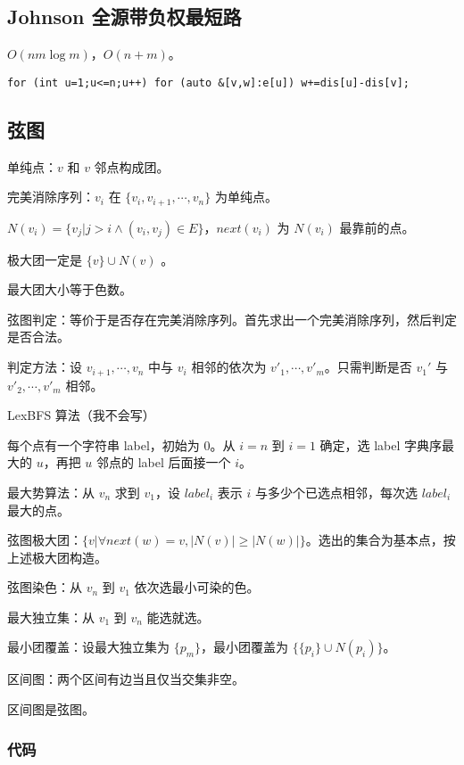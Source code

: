 \documentclass[12pt]{ctexart}
\begin{document}
\subsection{Johnson 全源带负权最短路}

$O(nm\log m)$，$O(n+m)$。

\begin{lstlisting}
for (int u=1;u<=n;u++) for (auto &[v,w]:e[u]) w+=dis[u]-dis[v];
\end{lstlisting}

\subsection{弦图}

单纯点：$v$ 和 $v$ 邻点构成团。

完美消除序列：$v_i$ 在 $\{v_i,v_{i+1},\cdots,v_n\}$ 为单纯点。

$N(v_i)=\{v_j|j>i\land (v_i,v_j)\in E\}$，$next(v_i)$ 为 $N(v_i)$ 最靠前的点。

极大团一定是 $\{v\}\cup N(v)$ 。

最大团大小等于色数。

弦图判定：等价于是否存在完美消除序列。首先求出一个完美消除序列，然后判定是否合法。

判定方法：设 $v_{i+1},\cdots,v_n$ 中与 $v_i$ 相邻的依次为 $v'_1,\cdots,v'_m$。只需判断是否 $v_1'$ 与 $v'_2,\cdots,v'_m$ 相邻。

LexBFS 算法（我不会写）

每个点有一个字符串 label，初始为 $0$。从 $i=n$ 到 $i=1$ 确定，选 label 字典序最大的 $u$，再把 $u$ 邻点的 label 后面接一个 $i$。

最大势算法：从 $v_n$ 求到 $v_1$，设 $label_i$ 表示 $i$ 与多少个已选点相邻，每次选 $label_i$ 最大的点。

弦图极大团：$\{v|\forall next(w)=v,|N(v)|\ge |N(w)|\}$。选出的集合为基本点，按上述极大团构造。

弦图染色：从 $v_n$ 到 $v_1$ 依次选最小可染的色。

最大独立集：从 $v_1$ 到 $v_n$ 能选就选。

最小团覆盖：设最大独立集为 $\{p_m\}$，最小团覆盖为 $\{\{p_i\}\cup N(p_i)\}$。

区间图：两个区间有边当且仅当交集非空。

区间图是弦图。

\subsubsection{代码}
\end{document}
